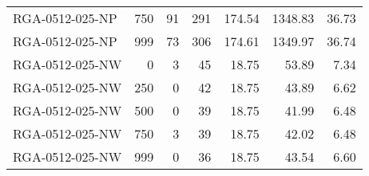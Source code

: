 \begin{table}[htbp]
{\begin{tabular}{lrrrrrr}
    RGA-0512-025-NP & 750    & 91     & 291    & 174.54 & 1348.83 & 36.73 \\
    RGA-0512-025-NP & 999    & 73     & 306    & 174.61 & 1349.97 & 36.74 \\ \hline
    RGA-0512-025-NW & 0      & 3      & 45     & 18.75  & 53.89  & 7.34 \\
    RGA-0512-025-NW & 250    & 0      & 42     & 18.75  & 43.89  & 6.62 \\
    RGA-0512-025-NW & 500    & 0      & 39     & 18.75  & 41.99  & 6.48 \\
    RGA-0512-025-NW & 750    & 3      & 39     & 18.75  & 42.02  & 6.48 \\
    RGA-0512-025-NW & 999    & 0      & 36     & 18.75  & 43.54  & 6.60 \\
    \bottomrule
    \end{tabular}}
  \label{tab:addlabel}%
\end{table}%

